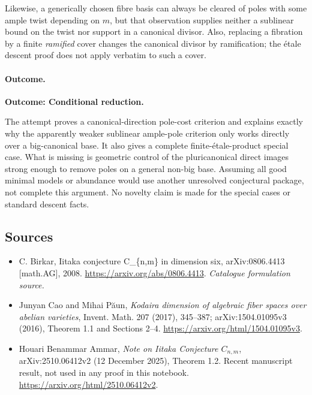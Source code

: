 \documentclass[11pt,a4paper]{article}
\numberwithin{equation}{section}
\begin{document}
Likewise, a generically chosen fibre basis can always be cleared of poles
with some ample twist depending on $m$, but that observation supplies
neither a sublinear bound on the twist nor support in a canonical divisor.
Also, replacing a fibration by a finite \emph{ramified} cover changes the
canonical divisor by ramification; the \'etale descent proof does not
apply verbatim to such a cover.

\paragraph{Outcome.}
\textbf{Outcome: Conditional reduction.}

The attempt proves a canonical-direction pole-cost criterion and explains
exactly why the apparently weaker sublinear ample-pole criterion only
works directly over a big-canonical base. It also gives a complete
finite-\'etale-product special case. What is missing is geometric control
of the pluricanonical direct images strong enough to remove poles on a
general non-big base. Assuming all good minimal models or abundance would
use another unresolved conjectural package, not complete this argument.
No novelty claim is made for the special cases or standard descent facts.

\subsection{Sources}
\begin{itemize}\raggedright
\item[\textnormal{[S1]}]\hypertarget{source:114:1}{} C. Birkar, Iitaka conjecture C\_\{n,m\} in dimension six, arXiv:0806.4413 [math.AG], 2008.
\url{https://arxiv.org/abs/0806.4413}.
{\small\textit{Catalogue formulation source.}}
\item[\textnormal{[E1]}]\hypertarget{extra:114:1}{} Junyan Cao and Mihai P\u{a}un,
\emph{Kodaira dimension of algebraic fiber spaces over abelian varieties},
Invent. Math. 207 (2017), 345--387; arXiv:1504.01095v3 (2016),
Theorem 1.1 and Sections 2--4.
\url{https://arxiv.org/html/1504.01095v3}.
\item[\textnormal{[E2]}]\hypertarget{extra:114:2}{} Houari Benammar Ammar,
\emph{Note on Iitaka Conjecture $C_{n,m}$}, arXiv:2510.06412v2
(12 December 2025), Theorem 1.2. Recent manuscript result, not used in
any proof in this notebook.
\url{https://arxiv.org/html/2510.06412v2}.
\end{itemize}
\end{document}
